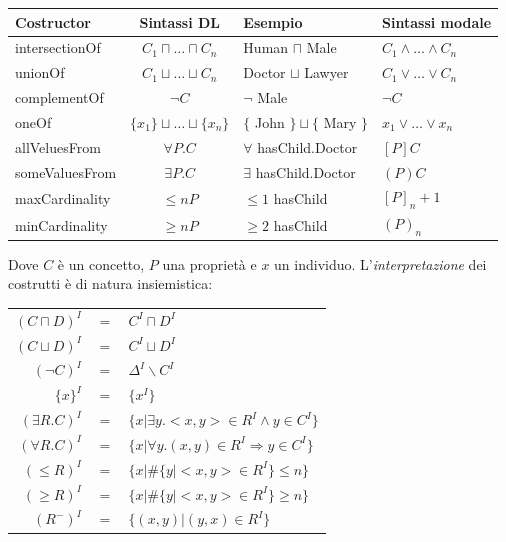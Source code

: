 \documentclass[11pt]{article}
\begin{document}
\begin{tabular}{l|cl|l} \newline \newline
  Costructor & Sintassi DL & Esempio & Sintassi modale \\ \hline
  intersectionOf & $C_1 \sqcap \ldots \sqcap C_n$  & Human $\sqcap$ Male & $C_1 \wedge \ldots \wedge C_n$ \\
  unionOf & $C_1 \sqcup \ldots \sqcup C_n$ & Doctor $\sqcup$ Lawyer & $C_1 \vee \ldots \vee C_n$ \\
  complementOf & $\neg C$ & $\neg$ Male & $\neg{C}$ \\
  oneOf & $\{x_1\} \sqcup \ldots \sqcup \{x_n\}$ & $\{$ John $\} \sqcup \{$ Mary $\}$ & $x_1 \vee \ldots \vee x_n$ \\
  allVeluesFrom & $\forall P.C$ & $\forall$ hasChild.Doctor & $[P]C$ \\
  someValuesFrom & $\exists P.C$ & $\exists$ hasChild.Doctor & $(P)C$ \\
  maxCardinality & $\leq nP$ & $\leq 1$ hasChild & $[P]_n + 1$ \\
  minCardinality & $\geq nP$ & $\geq 2$ hasChild & $(P)_n$ \\
\end{tabular} \newline \newline
Dove $C$ è un concetto, $P$ una proprietà e $x$ un individuo. \newline
L'\textit{interpretazione} dei costrutti è di natura insiemistica:
\begin{center}
\begin{tabular}{rcl} \newline \newline
  $(C \sqcap D)^I$ & $=$ & $C^I \sqcap D^I$ \\
  $(C \sqcup D)^I$ & $=$ & $C^I \sqcup D^I$ \\
  $(\neg{C})^I$ & $=$ & $\Delta^I \backslash C^I$ \\
  $\{x\}^I$ & $=$ & $\{x^I\}$ \\
  $(\exists R.C)^I$ &$=$& $\{x | \exists y.<x,y> \in R^I \wedge y \in C^I\}$ \\
  $(\forall R.C)^I$ &$=$& $\{x | \forall y.(x,y) \in R^I \Rightarrow y \in C^I\}$ \\
  $(\leq R)^I$ &$=$& $\{x | \# \{y | <x,y> \in R^I\} \leq n\}$ \\
  $(\geq R)^I$ &$=$& $\{x | \# \{y | <x,y> \in R^I\} \geq n\}$ \\
  $(R^-)^I$ &$=$& $\{(x,y) | (y,x) \in R^I\}$
\end{tabular} \newline \newline
\end{center}
\end{document}
